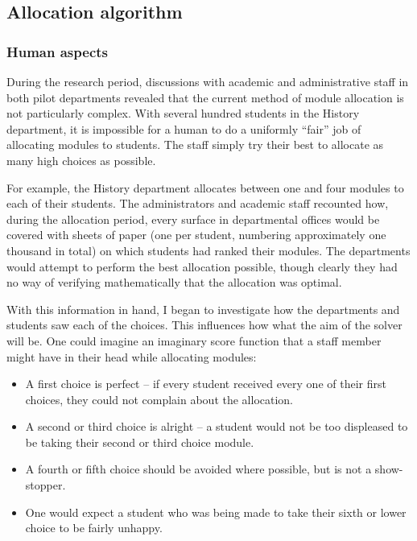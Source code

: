 
\subsection{Allocation algorithm}



\subsubsection{Human aspects}
\label{sec:algo_humanaspects}

During the research period, discussions with academic and administrative staff
in both pilot departments revealed that the current method of module
allocation is not particularly complex. With several hundred students in the
History department, it is impossible for a human to do a uniformly ``fair''
job of allocating modules to students. The staff simply try their best to
allocate as many high choices as possible.

For example, the History department allocates between one and four modules to
each of their students. The administrators and academic staff recounted how,
during the allocation period, every surface in departmental offices would be
covered with sheets of paper (one per student, numbering approximately one
thousand in total) on which students had ranked their modules. The departments
would attempt to perform the best allocation possible, though clearly they had
no way of verifying mathematically that the allocation was optimal.

With this information in hand, I began to investigate how the departments and
students saw each of the choices. This influences how what the aim of the
solver will be. One could imagine an imaginary score function that a staff
member might have in their head while allocating modules:

\begin{itemize}
  \item A first choice is perfect -- if every student received every one of
        their first choices, they could not complain about the allocation.
  \item A second or third choice is alright -- a student would not be too
        displeased to be taking their second or third choice module.
  \item A fourth or fifth choice should be avoided where possible, but is not
        a show-stopper.
  \item One would expect a student who was being made to take their sixth or
        lower choice to be fairly unhappy.
\end{itemize}

